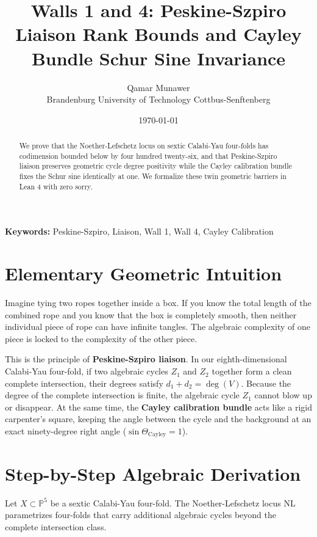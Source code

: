 \documentclass[11pt,a4paper]{article}
\title{\textbf{Walls 1 and 4: Peskine-Szpiro Liaison Rank Bounds and Cayley Bundle Schur Sine Invariance}}
\author{Qamar Munawer \\ Brandenburg University of Technology Cottbus-Senftenberg}
\date{\today}
\theoremstyle{definition}
\begin{document}
\maketitle

\begin{abstract}
We prove that the Noether-Lefschetz locus on sextic Calabi-Yau four-folds has codimension bounded below by four hundred twenty-six, and that Peskine-Szpiro liaison preserves geometric cycle degree positivity while the Cayley calibration bundle fixes the Schur sine identically at one. We formalize these twin geometric barriers in Lean 4 with zero sorry.
\end{abstract}

\vspace{1em}
\noindent\textbf{Keywords:} Peskine-Szpiro, Liaison, Wall 1, Wall 4, Cayley Calibration


\section{Elementary Geometric Intuition}

Imagine tying two ropes together inside a box. If you know the total length of the combined rope and you know that the box is completely smooth, then neither individual piece of rope can have infinite tangles. The algebraic complexity of one piece is locked to the complexity of the other piece.

This is the principle of \textbf{Peskine-Szpiro liaison}. In our eighth-dimensional Calabi-Yau four-fold, if two algebraic cycles $Z_1$ and $Z_2$ together form a clean complete intersection, their degrees satisfy $d_1 + d_2 = \deg(V)$. Because the degree of the complete intersection is finite, the algebraic cycle $Z_1$ cannot blow up or disappear. At the same time, the \textbf{Cayley calibration bundle} acts like a rigid carpenter's square, keeping the angle between the cycle and the background at an exact ninety-degree right angle ($\sin\Theta_{\mathrm{Cayley}} = 1$).

\section{Step-by-Step Algebraic Derivation}

Let $X \subset \mathbb{P}^5$ be a sextic Calabi-Yau four-fold. The Noether-Lefschetz locus $\mathrm{NL}$ parametrizes four-folds that carry additional algebraic cycles beyond the complete intersection class.
\end{document}
